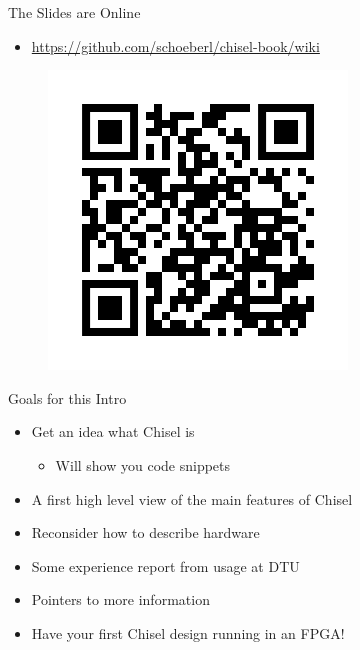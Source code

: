 \documentclass[xcolor=pdflatex,dvipsnames,table]{beamer}
\begin{document}
\begin{frame}[fragile]{The Slides are Online}
\begin{itemize}
\item \url{https://github.com/schoeberl/chisel-book/wiki}
\end{itemize}
\begin{figure}
    \centering
    \includegraphics[scale=0.5]{slides-link}
\end{figure}
\end{frame}


\begin{frame}[fragile]{Goals for this Intro}
\begin{itemize}
\item Get an idea what Chisel is
\begin{itemize}
\item Will show you code snippets
\end{itemize}
\item A first high level view of the main features of Chisel
\item Reconsider how to describe hardware
\item Some experience report from usage at DTU
\item Pointers to more information
\item Have your first Chisel design running in an FPGA!
\end{itemize}
\end{frame}

%
%
%
%
\end{document}
